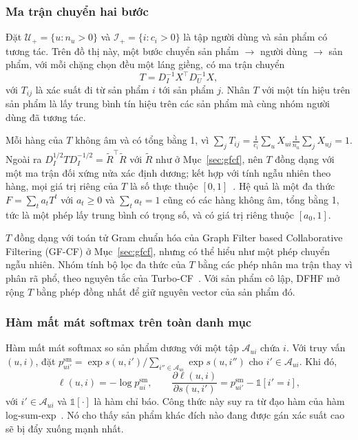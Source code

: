 \subsubsection{Ma trận chuyển hai bước}

Đặt $\mathcal{U}_+=\{u:n_u>0\}$ và $\mathcal{I}_+=\{i:c_i>0\}$ là tập người dùng và sản phẩm có tương tác. Trên đồ thị này, một bước chuyển sản phẩm $\to$ người dùng $\to$ sản phẩm, với mỗi chặng chọn đều một láng giềng, có ma trận chuyển
\begin{equation}
T=D_I^{-1}X^\top D_U^{-1}X ,
\label{eq:transition}
\end{equation}
với $T_{ij}$ là xác suất đi từ sản phẩm $i$ tới sản phẩm $j$. Nhân $T$ với một tín hiệu trên sản phẩm là lấy trung bình tín hiệu trên các sản phẩm mà cùng nhóm người dùng đã tương tác.

\begin{nx}
\label{rem:transition-filter}
Mỗi hàng của $T$ không âm và có tổng bằng 1, vì $\sum_jT_{ij}=\frac1{c_i}\sum_uX_{ui}\frac1{n_u}\sum_jX_{uj}=1$. Ngoài ra $D_I^{1/2}TD_I^{-1/2}=\tilde R^\top\tilde R$ với $\tilde R$ như ở Mục~\ref{sec:gfcf}, nên $T$ đồng dạng với một ma trận đối xứng nửa xác định dương; kết hợp với tính ngẫu nhiên theo hàng, mọi giá trị riêng của $T$ là số thực thuộc $[0,1]$~\cite[Mục~1.5]{chung1997spectral}. Hệ quả là một đa thức $F=\sum_t a_tT^t$ với $a_t\ge0$ và $\sum_ta_t=1$ cũng có các hàng không âm, tổng bằng 1, tức là một phép lấy trung bình có trọng số, và có giá trị riêng thuộc $[a_0,1]$.
\end{nx}

$T$ đồng dạng với toán tử Gram chuẩn hóa của Graph Filter based Collaborative Filtering (GF-CF) ở Mục~\ref{sec:gfcf}, nhưng có thể hiểu như một phép chuyển ngẫu nhiên. Nhóm tính bộ lọc đa thức của $T$ bằng các phép nhân ma trận thay vì phân rã phổ, theo nguyên tắc của Turbo-CF~\cite{park2024turbocf}. Với sản phẩm cô lập, DFHF mở rộng $T$ bằng phép đồng nhất để giữ nguyên vector của sản phẩm đó.

\subsubsection{Hàm mất mát softmax trên toàn danh mục}
\label{sec:losses}

Hàm mất mát softmax so sản phẩm dương với một tập $\mathcal{A}_{ui}$ chứa $i$. Với truy vấn $(u,i)$, đặt $p_{ui'}^{\mathrm{sm}}=\exp s(u,i')\big/\sum_{i''\in\mathcal{A}_{ui}}\exp s(u,i'')$ cho $i'\in\mathcal{A}_{ui}$. Khi đó,
\begin{equation}
\ell(u,i)=-\log p_{ui}^{\mathrm{sm}} ,\qquad
\frac{\partial\ell(u,i)}{\partial s(u,i')}=p_{ui'}^{\mathrm{sm}}-\mathbb{1}[i'=i],
\label{eq:softmax-ce}
\end{equation}
với $i'\in\mathcal{A}_{ui}$ và $\mathbb{1}[\cdot]$ là hàm chỉ báo. Công thức này suy ra từ đạo hàm của hàm log-sum-exp~\cite[Mục~3.1.5]{boyd2004convex}. Nó cho thấy sản phẩm khác đích nào đang được gán xác suất cao sẽ bị đẩy xuống mạnh nhất.

